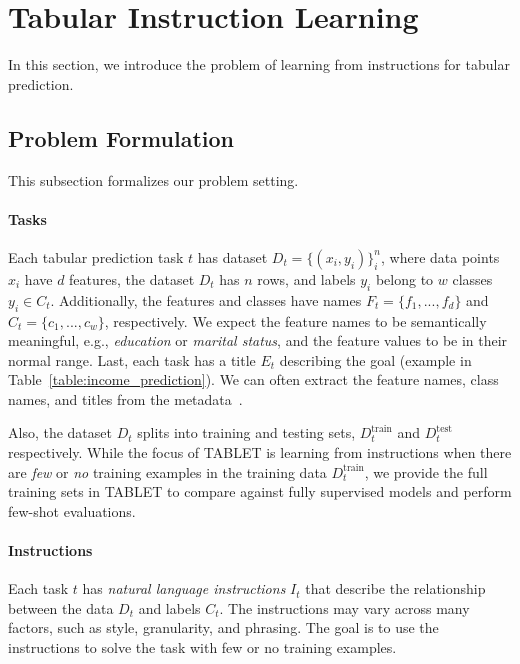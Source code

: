 \section{Tabular Instruction Learning}
\label{sec:method}

In this section, we introduce the problem of learning from instructions for tabular prediction.

\subsection{Problem Formulation}

This subsection formalizes our problem setting.

\paragraph{Tasks} Each tabular prediction task $t$ has dataset $D_t = \{ (x_i, y_i ) \}_{i}^{n}$, where data points $x_i$ have $d$ features, the dataset $D_t$ has $n$ rows, and labels $y_i$ belong to $w$ classes $y_i \in C_t$. Additionally, the features and classes have names $F_t=\{f_1,...,f_d\}$ and $C_t = \{ c_1 ,..., c_w \}$, respectively. We expect the feature names to be semantically meaningful, e.g., \textit{education} or \textit{marital status}, and the feature values to be in their normal range. Last, each task has a title $E_t$ describing the goal (example in Table~\ref{table:income_prediction}).
We can often extract the feature names, class names, and titles from the metadata~\cite{Dua:2019}.

Also, the dataset $D_t$ splits into training and testing sets, $D_{t}^{\textrm{train}}$ and $D_{t}^{\textrm{test}}$ respectively. While the focus of TABLET is learning from instructions when there are \textit{few} or \textit{no} training examples in the training data $D_{t}^{\textrm{train}}$, we provide the full training sets in TABLET to compare against fully supervised models and perform few-shot evaluations.

\paragraph{Instructions} Each task $t$ has \textit{natural language instructions} $I_t$ that describe the relationship between the data $D_t$ and labels $C_t$. The instructions may vary across many factors, such as style, granularity, and phrasing. The goal is to use the instructions to solve the task with few or no training examples.

